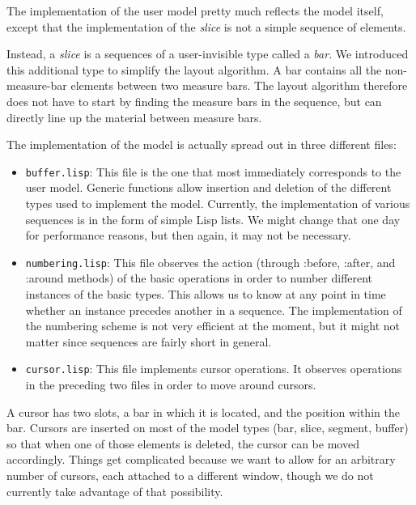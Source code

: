 \documentclass[11pt]{book}
\def\inputtex#1{}
\begin{document}
The implementation of the user model pretty much reflects the model
itself, except that the implementation of the \emph{slice} is not a
simple sequence of elements.

Instead, a \emph{slice} is a sequences of a user-invisible type called
a \emph{bar}.  We introduced this additional type to simplify the
layout algorithm.  A bar contains all the non-measure-bar elements
between two measure bars.  The layout algorithm therefore does not
have to start by finding the measure bars in the sequence, but can
directly line up the material between measure bars.

The implementation of the model is actually spread out in three
different files:

\begin{itemize} 
\item \texttt{buffer.lisp}: This file is the one that most immediately
  corresponds to the user model.  Generic functions allow insertion
  and deletion of the different types used to implement the model.
  Currently, the implementation of various sequences is in the form of
  simple Lisp lists.  We might change that one day for performance
  reasons, but then again, it may not be necessary. 
\item \texttt{numbering.lisp}: This file observes the action (through
  :before, :after, and :around methods) of the basic operations in
  order to number different instances of the basic types.  This allows
  us to know at any point in time whether an instance precedes another
  in a sequence.  The implementation of the numbering scheme is not
  very efficient at the moment, but it might not matter since
  sequences are fairly short in general.
\item \texttt{cursor.lisp}: This file implements cursor operations.
  It observes operations in the preceding two files in order to move
  around cursors.  
\end{itemize}

A cursor has two slots, a bar in which it is located, and the position
within the bar.  Cursors are inserted on most of the model types (bar,
slice, segment, buffer) so that when one of those elements is deleted,
the cursor can be moved accordingly.  Things get complicated because
we want to allow for an arbitrary number of cursors, each attached to
a different window, though we do not currently take advantage of that
possibility.

\inputtex{buffer.tex}
\end{document}
